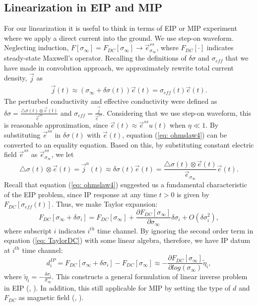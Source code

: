 \documentclass[a4paper, 11pt]{article}
\newcommand{\siginf}{\sigma_\infty}
\newcommand{\dsig}{\triangle\sigma}
\renewcommand {\j}  { {\vec j} }
\newcommand {\e}  { {\vec e} }
\newcommand{\peta}{\tilde{\eta}}
\newcommand{\dip}{d^{IP}}
\newcommand{\sigpert}{\delta\sigma}
\begin{document}
\subsection{Linearization in EIP and MIP}
For our linearization it is useful to think in terms of EIP or MIP experiment where we apply a direct current into the ground. We use step-on waveform. Neglecting induction, $F[\siginf]=F_{DC}[\siginf] \rightarrow \e^{ss}_{\siginf}$, where $F_{DC}[\cdot]$ indicates steady-state Maxwell's operator. Recalling the definitions of $\delta\sigma$ and $\sigma_{eff}$ that we have made in convolution approach, we approximately rewrite total current density, $\j$ as
\begin{eqnarray}
	\j(t) \approx (\siginf + \delta\sigma(t))\e(t) = \sigma_{eff}(t)\e(t).
  	\label{eq: ohmslaw4}
\end{eqnarray}
The perturbed conductivity and effective conductivity were defined as $\delta\sigma = \frac{\dsig(t)\otimes\e(t)}{\e^{ss}}$ and $\sigma_{eff} = \frac{\j}{\e^{ss}}$. Considering that we use step-on waveform, this is reasonable approximation, since $\e(t)\approx \e^{ss}u(t)$ when $\eta \ll 1$. By substituting $\vec{e}^{ss}$ in $\delta\sigma(t)$ with $\vec{e}(t)$, equation (\ref{eq: ohmslaw4}) can be converted to an equality equation. Based on this, by substituting constant electric field $\e^{ss}$ as $\e_{\siginf}^{ss}$, we let
\begin{equation}
  \dsig(t)\otimes\e(t) = \j^a(t) \approx \delta\sigma(t)\e(t)= \frac{\dsig(t)\otimes\e(t)}{\e_{\siginf}}\e(t).
  \label{eq: p_approx}
\end{equation}
Recall that equation (\ref{eq: ohmslaw4}) suggested us a fundamental characteristic of the EIP problem, since IP response at any time $t>0$ is given by $F_{DC}[\sigma_{eff}(t)]$. Thus, we make Taylor expansion:
\begin{equation}
  F_{DC}[\siginf + \delta\sigma_i] = F_{DC}[\siginf] + \frac{\partial F_{DC}[\siginf]}{\partial\siginf}\delta\sigma_i + O(\delta\sigma_i^2),
  \label{eq: TaylorDC}
\end{equation}
where subscript $i$ indicates $i^{th}$ time channel. By ignoring the second order term in equation (\ref{eq: TaylorDC}) with some linear algebra, therefore, we have IP datum at $i^{th}$ time channel:
\begin{equation}
  \dip_i = F_{DC}[\siginf + \delta\sigma_i] - F_{DC}[\siginf] \approx -\frac{\partial F_{DC}[\siginf]}{\partial log(\siginf)}\peta_i,
  \label{eq: EIPlinear1}
\end{equation}
where $\peta_i = -\frac{\sigpert_i}{\siginf}$. This constructs a general formulation of linear inverse problem in EIP (\cite{Yuval1997}, \cite{Hordt2006}). In addition, this still applicable for MIP by setting the type of $d$ and $F_{DC}$ as magnetic field (\cite{seigel1974}, \cite{Chen2003}).
\end{document}
